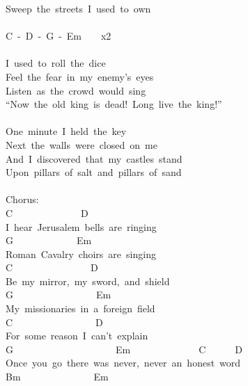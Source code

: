 \documentclass[]{book}
\begin{document}
Sweep~the~streets~I~used~to~own\\
~\\
C~-~D~-~G~-~Em~~~~x2\\
~\\
I~used~to~roll~the~dice~\\
Feel~the~fear~in~my~enemy's~eyes~\\
Listen~as~the~crowd~would~sing~\\
``Now~the~old~king~is~dead!~Long~live~the~king!''~\\
~\\
One~minute~I~held~the~key~\\
Next~the~walls~were~closed~on~me~\\
And~I~discovered~that~my~castles~stand~\\
Upon~pillars~of~salt~and~pillars~of~sand~\\
~\\
Chorus:\\
\hspace*{0.333em}\hspace*{0.333em}C~~~~~~~~~~~~~~D\\
I~hear~Jerusalem~bells~are~ringing\\
G~~~~~~~~~~~~~Em\\
Roman~Cavalry~choirs~are~singing\\
C~~~~~~~~~~~~~~~~D\\
Be~my~mirror,~my~sword,~and~shield\\
\hspace*{0.333em}\hspace*{0.333em}\hspace*{0.333em}G~~~~~~~~~~~~~~~~~Em\\
My~missionaries~in~a~foreign~field\\
C~~~~~~~~~~~~~~~~~D\\
For~some~reason~I~can't~explain\\
G~~~~~~~~~~~~~~~~~~~~~Em~~~~~~~~~~~~~~C~~~~~~D\\
Once~you~go~there~was~never,~never~an~honest~word\\
\hspace*{0.333em}\hspace*{0.333em}\hspace*{0.333em}\hspace*{0.333em}\hspace*{0.333em}\hspace*{0.333em}\hspace*{0.333em}\hspace*{0.333em}\hspace*{0.333em}Bm~~~~~~~~~~~~~~~Em\\
\end{document}
